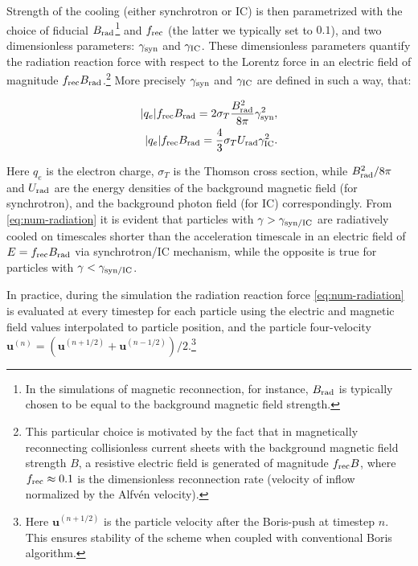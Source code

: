 \noindent Strength of the cooling (either synchrotron or IC) is then parametrized with the choice of fiducial $B_{\rm rad}$\footnote{In the simulations of magnetic reconnection, for instance, $B_{\rm rad}$ is typically chosen to be equal to the background magnetic field strength.} and $f_{\rm rec}$ (the latter we typically set to $0.1$), and two dimensionless parameters: $\gamma_{\rm syn}$ and $\gamma_{\rm IC}$. These dimensionless parameters quantify the radiation reaction force with respect to the Lorentz force in an electric field of magnitude $f_{\rm rec}B_{\rm rad}$.\footnote{This particular choice is motivated by the fact that in magnetically reconnecting collisionless current sheets with the background magnetic field strength $B$, a resistive electric field is generated of magnitude $f_{\rm rec} B$, where $f_{\rm rec}\approx 0.1$ is the dimensionless reconnection rate (velocity of inflow normalized by the Alfv\'en velocity).} More precisely $\gamma_{\rm syn}$ and $\gamma_{\rm IC}$ are defined in such a way, that:

\begin{equation}
    \begin{aligned}
        |q_e|f_{\rm rec}B_{\rm rad} = 2\sigma_T \frac{B_{\rm rad}^2}{8\pi} \gamma_{\rm syn}^2,\\
        |q_e|f_{\rm rec}B_{\rm rad} = \frac{4}{3}\sigma_T U_{\rm rad} \gamma_{\rm IC}^2.
    \end{aligned}
\end{equation}

\noindent Here $q_e$ is the electron charge, $\sigma_T$ is the Thomson cross section, while $B_{\rm rad}^2/8\pi$ and $U_{\rm rad}$ are the energy densities of the background magnetic field (for synchrotron), and the background photon field (for IC) correspondingly. From \eqref{eq:num-radiation} it is evident that particles with $\gamma > \gamma_{\rm syn/IC}$ are radiatively cooled on timescales shorter than the acceleration timescale in an electric field of $E=f_{\rm rec}B_{\rm rad}$ via synchrotron/IC mechanism, while the opposite is true for particles with $\gamma < \gamma_{\rm syn/IC}$. 

In practice, during the simulation the radiation reaction force \eqref{eq:num-radiation} is evaluated at every timestep for each particle using the electric and magnetic field values interpolated to particle position, and the particle four-velocity $\bm{u}^{(n)} = (\bm{u}^{(n+1/2)} + \bm{u}^{(n-1/2)})/2$.\footnote{Here $\bm{u}^{(n+1/2)}$ is the particle velocity after the Boris-push at timestep $n$. This ensures stability of the scheme when coupled with conventional Boris algorithm.} 

